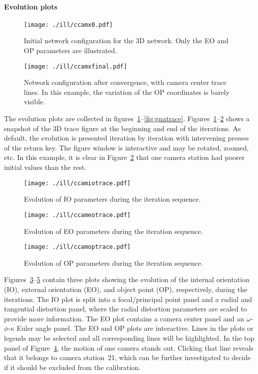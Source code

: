 \documentclass{article}
\begin{document}
\paragraph{Evolution plots}
\label{sec:org90902d7}

\begin{figure}[tbp]
\centering
\texttt{[image: ./ill/ccamx0.pdf]}
\caption{\label{fig:camx0}Initial network configuration for the 3D network. Only the EO and OP parameters are illustrated.}
\end{figure}

\begin{figure}[tbp]
\centering
\texttt{[image: ./ill/ccamxfinal.pdf]}
\caption{\label{fig:camxfinal}Network configuration after convergence, with camera center trace lines. In this example, the variation of the OP coordinates is barely visible.}
\end{figure}

The evolution plots are collected in
figures~\ref{fig:camx0}--\ref{fig:gnatrace}.
Figures~\ref{fig:camx0}--\ref{fig:camxfinal} shows a snapshot of the 3D trace
figure at the beginning and end of the iterations. As default, the
evolution is presented iteration by iteration with intervening presses
of the return key. The figure window is interactive and may be
rotated, zoomed, etc. In this example, it is clear in
Figure~\ref{fig:camxfinal} that one camera station had poorer initial
values than the rest.

\begin{figure}[tbp]
\centering
\texttt{[image: ./ill/ccamiotrace.pdf]}
\caption{\label{fig:IOtrace}Evolution of IO parameters during the iteration sequence.}
\end{figure}

\begin{figure}[tbp]
\centering
\texttt{[image: ./ill/ccameotrace.pdf]}
\caption{\label{fig:EOtrace}Evolution of EO parameters during the iteration sequence.}
\end{figure}

\begin{figure}[tbp]
\centering
\texttt{[image: ./ill/ccamoptrace.pdf]}
\caption{\label{fig:OPtrace}Evolution of OP parameters during the iteration sequence.}
\end{figure}

Figures~\ref{fig:IOtrace}--\ref{fig:OPtrace} contain three plots showing the
evolution of the internal orientation (IO), external orientation (EO),
and object point (OP), respectively, during the iterations. The IO
plot is split into a focal/principal point panel and a radial and
tangential distortion panel, where the radial distortion parameters
are scaled to provide more information. The EO plot contains a camera
center panel and an \(\omega\)-\(\phi\)-\(\kappa\) Euler angle panel. The EO and
OP plots are interactive. Lines in the plots or legends may be
selected and all corresponding lines will be highlighted. In the top
panel of Figure~\ref{fig:EOtrace}, the motion of one camera stands out.
Clicking that line reveals that it belongs to camera station~21,
which can be further investigated to decide if it should be excluded
from the calibration.
\end{document}

